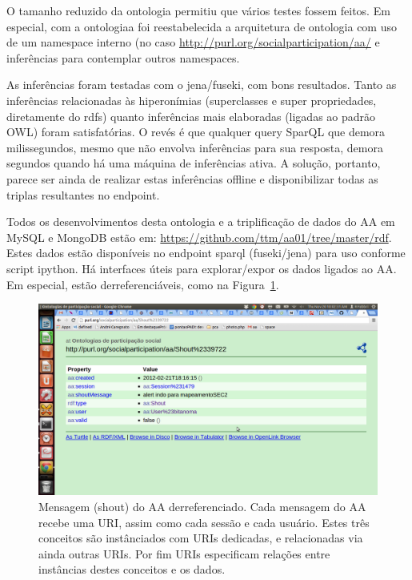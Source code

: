 \documentclass[12pt]{article}
\begin{document}
O tamanho reduzido da ontologia permitiu que vários testes fossem feitos. Em especial, com a ontologiaa foi reestabelecida a arquitetura de ontologia com uso de um namespace interno (no caso \url{http://purl.org/socialparticipation/aa/} e inferências para contemplar outros namespaces.

As inferências foram testadas com o jena/fuseki, com bons resultados. Tanto as inferências relacionadas às hiperonímias (superclasses e super propriedades, diretamente do rdfs) quanto inferências mais elaboradas (ligadas ao padrão OWL) foram satisfatórias. O revés é que qualquer query SparQL que demora milissegundos, mesmo que não envolva inferências para sua resposta, demora segundos quando há uma máquina de inferências ativa. A solução, portanto, parece ser ainda de realizar estas inferências offline e disponibilizar todas as triplas resultantes no endpoint.

Todos os desenvolvimentos desta ontologia e a triplificação de dados do AA em MySQL e MongoDB estão em: \url{https://github.com/ttm/aa01/tree/master/rdf}. Estes dados estão disponíveis no endpoint sparql (fuseki/jena) para uso conforme script ipython. Há interfaces úteis para explorar/expor os dados ligados ao AA. Em especial, estão derreferenciáveis, como na Figura~\ref{fig:aashout}.

\begin{figure}[h!]
  \centering
    \includegraphics[width=\textwidth]{../figs/aaShoutPubby.png}
  \caption{Mensagem (shout) do AA derreferenciado. Cada mensagem do AA recebe uma URI, assim como cada sessão e cada usuário. Estes três conceitos são instânciados com URIs dedicadas, e relacionadas via ainda outras URIs. Por fim URIs especificam relações entre instâncias destes conceitos e os dados.}\label{fig:aashout}
\end{figure}
\end{document}

